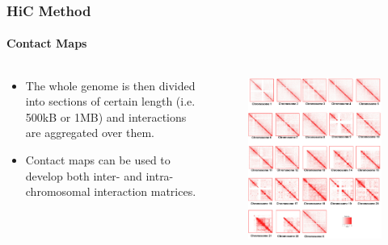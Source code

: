 \documentclass{beamer}
\begin{document}
\begin{frame}
    \frametitle{HiC Method}
    \framesubtitle{Contact Maps}
    \begin{columns}
        \begin{column}{.5\textwidth}
            \begin{itemize}
                \item The whole genome is then divided into sections of certain length (i.e. 500kB or 1MB)
                    and interactions are aggregated over them.
                \item Contact maps can be used to develop both inter- and 
                    intra-chromosomal interaction matrices.

            \end{itemize}
        \end{column}
        \begin{column}{.5\textwidth}
            \begin{figure}
                \centering
                \includegraphics[width=.9\textwidth]{figures/normal-b-cell-all-heatmaps.jpeg}
                \caption*{\cite{wang2013properties}}
            \end{figure}
        \end{column}
    \end{columns}
\end{frame}
\end{document}
